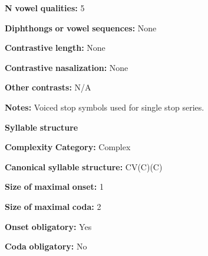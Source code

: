 \begin{styleBody}
\textbf{N} \textbf{vowel} \textbf{qualities:} 5
\end{styleBody}

\begin{styleBody}
\textbf{Diphthongs} \textbf{or} \textbf{vowel} \textbf{sequences:} None
\end{styleBody}

\begin{styleBody}
\textbf{Contrastive} \textbf{length:} None
\end{styleBody}

\begin{styleBody}
\textbf{Contrastive} \textbf{nasalization:} None
\end{styleBody}

\begin{styleBody}
\textbf{Other} \textbf{contrasts:} N/A
\end{styleBody}

\begin{styleBody}
\textbf{Notes:} Voiced stop symbols used for single stop series.
\end{styleBody}

\begin{styleBody}
\textbf{Syllable} \textbf{structure}
\end{styleBody}

\begin{styleBody}
\textbf{Complexity} \textbf{Category:} Complex
\end{styleBody}

\begin{styleBody}
\textbf{Canonical} \textbf{syllable} \textbf{structure:} CV(C)(C) \citep[186-96]{Merlan1989}
\end{styleBody}

\begin{styleBody}
\textbf{Size} \textbf{of} \textbf{maximal} \textbf{onset:} 1
\end{styleBody}

\begin{styleBody}
\textbf{Size} \textbf{of} \textbf{maximal} \textbf{coda:} 2
\end{styleBody}

\begin{styleBody}
\textbf{Onset} \textbf{obligatory:} Yes
\end{styleBody}

\begin{styleBody}
\textbf{Coda} \textbf{obligatory:} No
\end{styleBody}


